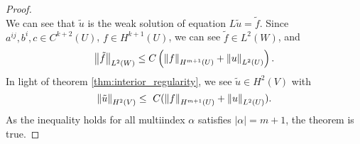 \begin{proof}
\begin{equation}
    \end{equation}
    We can see that $\tilde{u}$ is the weak solution of equation $L\tilde{u}=\tilde{f}$. Since $a^{ij},b^{i},c\in C^{k+2}(U)$, $f\in H^{k+1}(U)$, we can see $\tilde{f}\in L^{2}(W)$, and 
    \begin{equation}
        \left\|\tilde{f}\right\|_{L^{2}(W)}\le C\left(\left\|f\right\|_{H^{m+1}(U)}+\left\|u\right\|_{L^{2}(U)}\right).
    \end{equation}
    In light of theorem \ref{thm:interior_regularity}, we see $\tilde{u}\in H^{2}(V)$ with 
    \begin{equation}
        \norm{\tilde{u}}_{H^{2}(V)}\le\ C(\norm{f}_{H^{m+1}(U)}+\norm{u}_{L^{2}(U)}).
    \end{equation}
    As the inequality holds for all multiindex $\alpha$ satisfies $|\alpha|=m+1$, the theorem is true.
\end{proof}